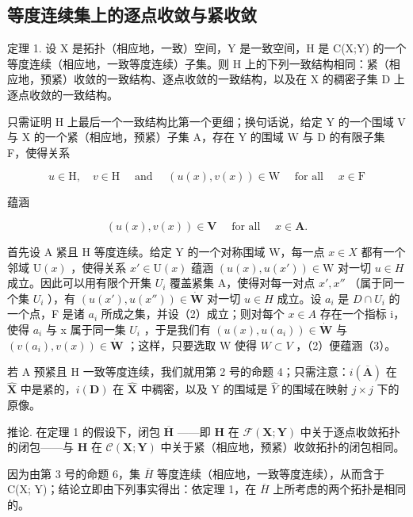 \subsection{等度连续集上的逐点收敛与紧收敛}

定理 1. 设 X 是拓扑（相应地，一致）空间，Y 是一致空间，H 是 C(X;Y) 的一个等度连续（相应地，一致等度连续）子集。则 H 上的下列一致结构相同：紧（相应地，预紧）收敛的一致结构、逐点收敛的一致结构，以及在 X 的稠密子集 D 上逐点收敛的一致结构。

只需证明 H 上最后一个一致结构比第一个更细；换句话说，给定 Y 的一个围域 V 与 X 的一个紧（相应地，预紧）子集 A，存在 Y 的围域 W 与 D 的有限子集 F，使得关系

\[
u \in \mathrm{H}, \quad v \in \mathrm{H} \quad \text { and } \quad (u (x), v (x)) \in \mathrm{W} \quad \text { for   all } \quad x \in \mathrm{F}\tag{2}
\]

蕴涵

\[
(u (x), v (x)) \in \mathbf {V} \quad \text { for   all } \quad x \in \mathbf {A}.\tag{3}
\]

首先设 A 紧且 H 等度连续。给定 Y 的一个对称围域 W，每一点 \(x \in X\) 都有一个邻域 \(\mathrm{U}(x)\) ，使得关系 \(x' \in \mathrm{U}(x)\) 蕴涵 \((u(x), u(x')) \in \mathrm{W}\) 对一切 \(u \in H\) 成立。因此可以用有限个开集 \(U_i\) 覆盖紧集 A，使得对每一对点 \(x', x''\) （属于同一个集 \(U_i\) ），有 \((u(x'), u(x'')) \in \dot{\mathbf{W}}\) 对一切 \(u \in H\) 成立。设 \(a_i\) 是 \(D \cap U_i\) 的一个点，F 是诸 \(a_i\) 所成之集，并设（2）成立；则对每个 \(x \in A\) 存在一个指标 i，使得 \(a_i\) 与 x 属于同一集 \(U_i\) ，于是我们有 \((u(x), u(a_i)) \in \dot{\mathbf{W}}\) 与 \((v(a_i), v(x)) \in \dot{\mathbf{W}}\) ；这样，只要选取 W 使得 \(W \subset V\) ，（2）便蕴涵（3）。

若 A 预紧且 H 一致等度连续，我们就用第 2 号的命题 4；只需注意：\(i(\overline{\mathbf{A}})\) 在 \(\hat{\mathbf{X}}\) 中是紧的，\(i(\mathbf{D})\) 在 \(\hat{\mathbf{X}}\) 中稠密，以及 Y 的围域是 \(\hat{Y}\) 的围域在映射 \(j \times j\) 下的原像。

推论. 在定理 1 的假设下，闭包 \(\overline{\mathbf{H}}\) ——即 \(\mathbf{H}\) 在 \(\mathcal{F}(\mathbf{X};\mathbf{Y})\) 中关于逐点收敛拓扑的闭包——与 \(\mathbf{H}\) 在 \(\mathcal{C}(\mathbf{X};\mathbf{Y})\) 中关于紧（相应地，预紧）收敛拓扑的闭包相同。

因为由第 3 号的命题 6，集 \(\overline{H}\) 等度连续（相应地，一致等度连续），从而含于 C(X; Y)；结论立即由下列事实得出：依定理 1，在 \(\overline{H}\) 上所考虑的两个拓扑是相同的。

